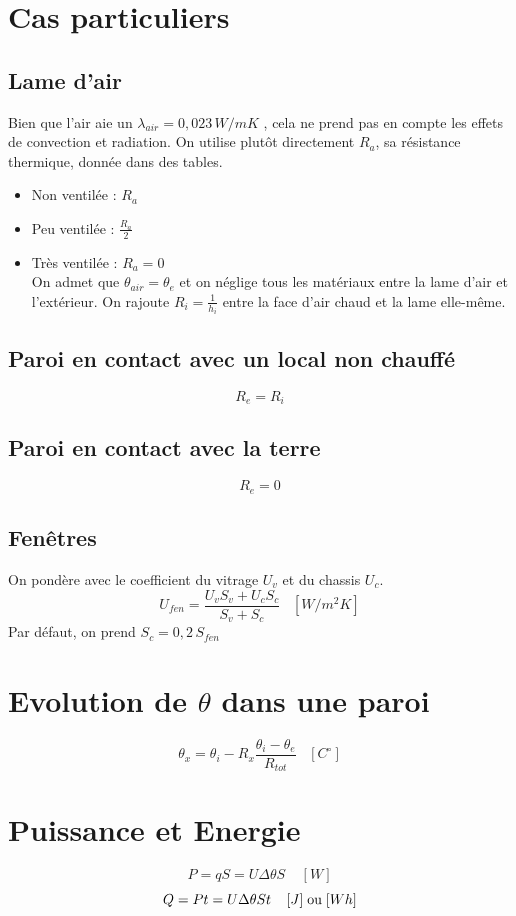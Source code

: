 \documentclass[11pt]{report}
\begin{document}
\section{Cas particuliers}
\subsection*{Lame d'air} Bien que l'air aie un $\lambda_{air} = 0,023 \,W/mK$ , cela ne prend pas en compte les effets de convection et radiation. On utilise plutôt directement $R_a$, sa résistance thermique, donnée dans des tables.

\begin{itemize}
\item Non ventilée : $R_a$ 
\item Peu ventilée :  $\displaystyle \frac{R_a}{2}$
\item Très ventilée : $R_a=0$\\ On admet que $\theta_{air}=\theta_e$ et on néglige tous les matériaux entre la lame d'air et l'extérieur. On rajoute $R_i=\frac{1}{h_i}$ entre la face d'air chaud et la lame elle-même.
\end{itemize}

\subsection*{Paroi en contact avec un local non chauffé} $$R_e = R_i$$
\subsection*{Paroi en contact avec la terre} $$R_e=0$$
\subsection*{Fenêtres} On pondère avec le coefficient du vitrage $U_v$ et  du chassis $U_c$.
$$U_{fen}=\frac{U_v S_v + U_c S_c}{S_v+S_c}\;\;\;[W/m^2K]$$
Par défaut, on prend $S_c = 0,2\, S_{fen}$


\section{Evolution de $\theta$ dans une paroi}
$$\theta_x = \theta_i - R_x \frac{\theta_i - \theta_e}{R_{tot}}\;\;\;[C^{\circ}]$$

\section{Puissance et Energie}
$$P = q S = U \Delta \theta S \;\;\;\; [W]$$
$$Q = P t = U \Delta \theta S t\;\;\;\; [J] \; \textup{ou} \;[Wh]$$
\end{document}
